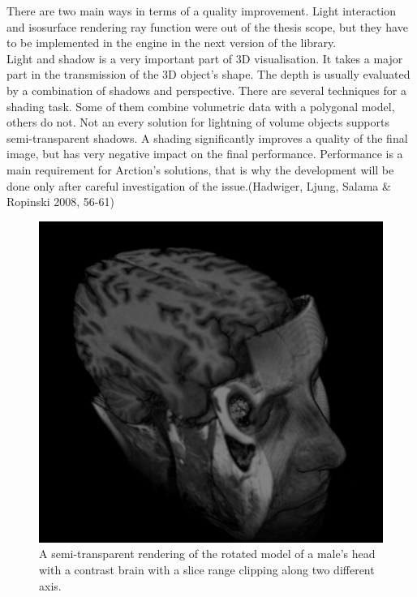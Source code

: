 \documentclass[twoside, english, 11pt]{report}
\begin{document}
There are two main ways in terms of a quality improvement. Light interaction and isosurface rendering ray function were out of the thesis scope, but they have to be implemented in the engine in the next version of the library.\\

Light and shadow is a very important part of 3D visualisation. It takes a major part in the transmission of the 3D object's shape. The depth is usually evaluated by a combination of shadows and perspective. There are several techniques for a shading task. Some of them combine volumetric data with a polygonal model, others do not. Not an every solution for lightning of volume objects supports semi-transparent shadows. A shading significantly improves a quality of the final image, but has very negative impact on the final performance. Performance is a main requirement for Arction's solutions, that is why the development will be done only after careful investigation of the issue.(Hadwiger, Ljung, Salama \& Ropinski 2008, 56-61)\\


\begin{figure}[H]
\centerline{\includegraphics[scale = 0.7]{img/cuttedhead}}
\caption{A semi-transparent rendering of the rotated model of a male's head with a contrast brain with a slice range clipping along two different axis.\label{fig:cuttedhead}}
\end{figure}
\end{document}
